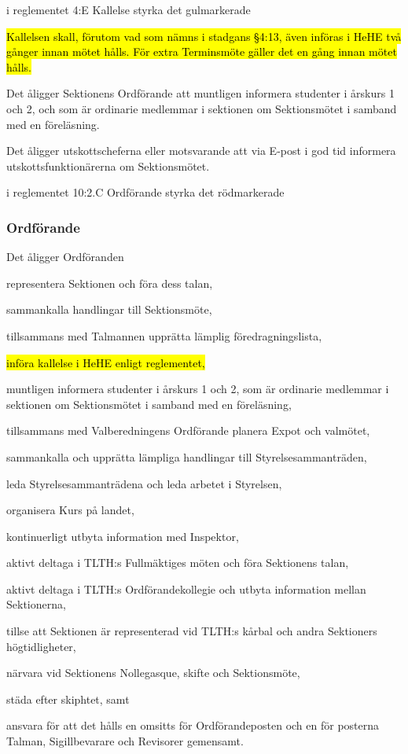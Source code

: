 \documentclass[../_main/handlingar.tex]{subfiles}
\begin{document}
\begin{attsatser}
    \att i reglementet 4:E Kallelse styrka det gulmarkerade

    \hl{Kallelsen skall, förutom vad som nämns i stadgans §4:13, även införas i HeHE två gånger innan mötet hålls. För extra Terminsmöte gäller det en gång innan mötet hålls.} 

    Det åligger Sektionens Ordförande att muntligen informera studenter i årskurs 1 och 2, och som är ordinarie medlemmar i sektionen om Sektionsmötet i samband med en föreläsning. 

    Det åligger utskottscheferna eller motsvarande att via E-post i god tid informera utskottsfunktionärerna om Sektionsmötet.

 \newpage
    \att i reglementet 10:2.C Ordförande styrka det rödmarkerade

    \subsubsection{Ordförande}
    Det åligger Ordföranden
    \begin{attlist}
    \item representera Sektionen och föra dess talan,
    \item sammankalla handlingar till Sektionsmöte,
    \item tillsammans med Talmannen upprätta lämplig föredragningslista,
    \item \hl{införa kallelse i HeHE enligt reglementet,}
    \item muntligen informera studenter i årskurs 1 och 2, som är ordinarie medlemmar i sektionen om Sektionsmötet i samband med en föreläsning,
    \item tillsammans med Valberedningens Ordförande planera Expot och valmötet,
    \item sammankalla och upprätta lämpliga handlingar till Styrelsesammanträden,
    \item leda Styrelsesammanträdena och leda arbetet i Styrelsen,
    \item organisera Kurs på landet,
    \item kontinuerligt utbyta information med Inspektor,
    \item aktivt deltaga i TLTH:s Fullmäktiges möten och föra Sektionens talan,
    \item aktivt deltaga i TLTH:s Ordförandekollegie och utbyta information mellan Sektionerna,
    \item tillse att Sektionen är representerad vid TLTH:s kårbal och andra Sektioners högtidligheter,
    \item närvara vid Sektionens Nollegasque, skifte och Sektionsmöte,
    \item städa efter skiphtet, samt
    \item ansvara för att det hålls en omsitts för Ordförandeposten och en för posterna Talman, Sigillbevarare och Revisorer gemensamt.
    \end{attlist}


\end{attsatser}
\end{document}
